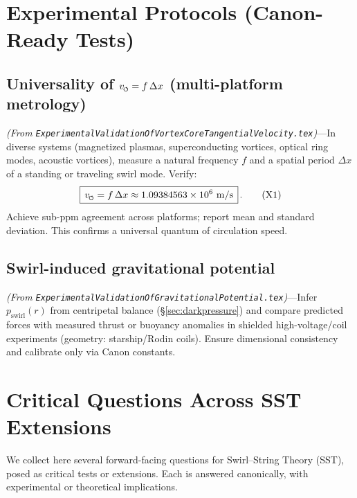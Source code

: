 \documentclass[11pt]{article}
\newcommand{\swirlarrow}{%
     \mathchoice{\mkern-2mu\scriptstyle\boldsymbol{\circlearrowleft}}%
                {\mkern-2mu\scriptstyle\boldsymbol{\circlearrowleft}}%
                {\mkern-2mu\scriptscriptstyle\boldsymbol{\circlearrowleft}}%
                {\mkern-2mu\scriptscriptstyle\boldsymbol{\circlearrowleft}}%
}
\newcommand{\vscore}{v_{\swirlarrow}}                    %
\begin{document}
\section{Experimental Protocols (Canon-Ready Tests)}
\label{sec:experiments}
\subsection*{Universality of $\vscore = f\,\Delta x$ (multi-platform metrology)}
    \textit{(From \texttt{ExperimentalValidationOfVortexCoreTangentialVelocity.tex})}—In diverse systems (magnetized plasmas, superconducting vortices, optical ring modes, acoustic vortices), measure a natural frequency $f$ and a spatial period $\Delta x$ of a standing or traveling swirl mode. Verify:
    \begin{equation}
    \boxed{\,\vscore = f\,\Delta x \approx 1.09384563\times10^{6}\ \mathrm{m/s}\,}\,. \tag{X1}
    \end{equation}
    Achieve sub-ppm agreement across platforms; report mean and standard deviation. This confirms a universal quantum of circulation speed.

\subsection*{Swirl-induced gravitational potential}
    \textit{(From \texttt{ExperimentalValidationOfGravitationalPotential.tex})}—Infer $p_{\text{swirl}}(r)$ from centripetal balance (\S\ref{sec:darkpressure}) and compare predicted forces with measured thrust or buoyancy anomalies in shielded high-voltage/coil experiments (geometry: starship/Rodin coils). Ensure dimensional consistency and calibrate only via Canon constants.

\section{Critical Questions Across SST Extensions}
\label{sec:critical-questions}
We collect here several forward-facing questions for Swirl–String Theory (SST), posed as critical tests or extensions. Each is answered canonically, with experimental or theoretical implications.
\end{document}

